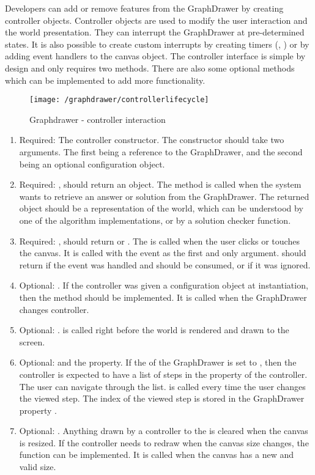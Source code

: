 Developers can add or remove features from the GraphDrawer by creating controller objects. Controller objects are used to modify the user interaction and the world presentation. They can interrupt the GraphDrawer at pre-determined states. It is also possible to create custom interrupts by creating timers (, ) or by adding event handlers to the canvas object. The controller interface is simple by design and only requires two methods. There are also some optional methods which can be implemented to add more functionality.
\begin{figure}[H]
    \centering
    \texttt{[image: /graphdrawer/controllerlifecycle]}
    \caption{Graphdrawer - controller interaction}
    \label{fig:graphdrawerControllerLifeCycle}
\end{figure}
\begin{enumerate}
    \item Required: The controller constructor. The constructor should take two arguments. The first being a reference to the GraphDrawer, and the second being an optional configuration object.
    \item Required: , should return an object. The  method is called when the system wants to retrieve an answer or solution from the GraphDrawer. The returned object should be a representation of the world, which can be understood by one of the algorithm implementations, or by a solution checker function.
    \item Required: , should return  or . The  is called when the user clicks or touches the canvas. It is called with the event as the first and only argument.  should return  if the event was handled and should be consumed, or  if it was ignored.
    \item Optional: . If the controller was given a configuration object at instantiation, then the  method should be implemented. It is called when the GraphDrawer changes controller.
    \item Optional: .  is called right before the world is rendered and drawn to the screen.
    \item Optional:  and the  property. If the  of the GraphDrawer is set to , then the controller is expected to have a list of steps in the  property of the controller. The user can navigate through the list.  is called every time the user changes the viewed step. The index of the viewed step is stored in the GraphDrawer property .
    \item Optional: . Anything drawn by a controller to the  is cleared when the canvas is resized. If the controller needs to redraw when the canvas size changes, the  function can be implemented. It is called when the canvas has a new and valid size. 
\end{enumerate}

